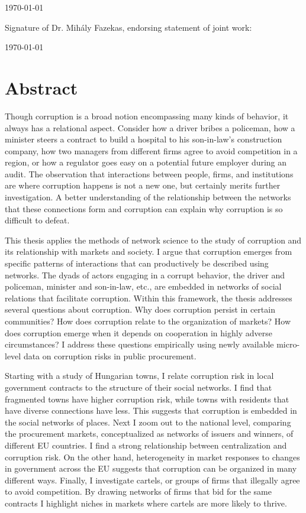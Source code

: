 \documentclass[a4paper,twoside,12pt]{book}
\begin{document}
\vspace{2cm}
\noindent
\monthyeardate\today


\vspace{3.5cm}
\noindent
Signature of Dr. Mih\'aly Fazekas, endorsing statement of joint work:

\vspace{2cm}
\noindent
\monthyeardate\today




\chapter*{Abstract}
Though corruption is a broad notion encompassing many kinds of behavior, it always has a relational aspect. Consider how a driver bribes a policeman, how a minister steers a contract to build a hospital to his son-in-law's construction company, how two managers from different firms agree to avoid competition in a region, or how a regulator goes easy on a potential future employer during an audit. The observation that interactions between people, firms, and institutions are where corruption happens is not a new one, but certainly merits further investigation. A better understanding of the relationship between the networks that these connections form and corruption can explain why corruption is so difficult to defeat.

This thesis applies the methods of network science to the study of corruption and its relationship with markets and society. I argue that corruption emerges from specific patterns of interactions that can productively be described using networks. The dyads of actors engaging in a corrupt behavior, the driver and policeman, minister and son-in-law, etc., are embedded in networks of social relations that facilitate corruption. Within this framework, the thesis addresses several questions about corruption. Why does corruption persist in certain communities? How does corruption relate to the organization of markets? How does corruption emerge when it depends on cooperation in highly adverse circumstances? I address these questions empirically using newly available micro-level data on corruption risks in public procurement.

Starting with a study of Hungarian towns, I relate corruption risk in local government contracts to the structure of their social networks. I find that fragmented towns have higher corruption risk, while towns with residents that have diverse connections have less. This suggests that corruption is embedded in the social networks of places. Next I zoom out to the national level, comparing the procurement markets, conceptualized as networks of issuers and winners, of different EU countries. I find a strong relationship between centralization and corruption risk. On the other hand, heterogeneity in market responses to changes in government across the EU suggests that corruption can be organized in many different ways. Finally, I investigate cartels, or groups of firms that illegally agree to avoid competition. By drawing networks of firms that bid for the same contracts I highlight niches in markets where cartels are more likely to thrive.
\end{document}
